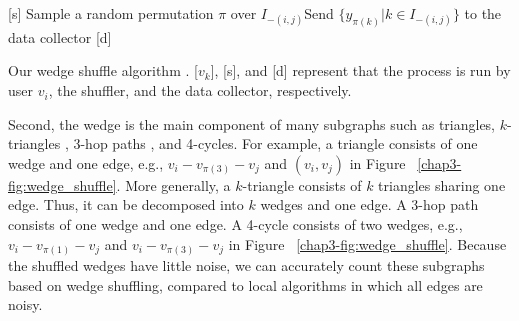 \setlength{\algomargin}{5mm}
\begin{algorithm}[t]
  \SetAlgoLined
  [s] Sample a random permutation $\pi$ over $I_{-(i,j)}$\;
  [s] Send $\{y_{\pi(k)} | k \in I_{-(i,j)}\}$ to the data collector\;
  [d] 
  \caption{Our wedge shuffle algorithm \AlgWS{}. 
  [$v_k$], [s], and [d] represent that the process is run by user $v_i$, the shuffler, and the data collector, respectively. 
  }\label{chap3-alg:WShuffle}
\end{algorithm}

Second, the wedge is the main component of many subgraphs such as triangles, 
$k$-triangles \cite{Karwa_PVLDB11}, 
3-hop paths \cite{Sun_CCS19}, 
and 4-cycles. 
For example, a triangle consists of one wedge and one edge, e.g., $v_i-v_{\pi(3)}-v_j$ and $(v_i, v_j)$ in Figure ~\ref{chap3-fig:wedge_shuffle}. 
More generally, a $k$-triangle consists of $k$ triangles sharing one edge. 
Thus, it can be decomposed into $k$ wedges and one edge. 
A 3-hop path consists of one wedge and one edge. 
A 4-cycle consists of two wedges, e.g., $v_i-v_{\pi(1)}-v_j$ and $v_i-v_{\pi(3)}-v_j$ in Figure ~\ref{chap3-fig:wedge_shuffle}. 
Because the shuffled wedges have little noise, we can accurately count these subgraphs based on wedge shuffling, compared to local algorithms in which all edges are noisy. 

